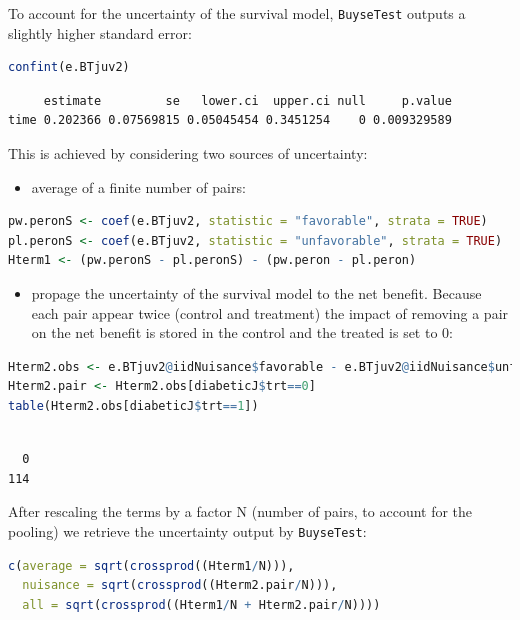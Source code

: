 \documentclass[12pt]{article}
\begin{document}
To account for the uncertainty of the survival model, \texttt{BuyseTest}
outputs a slightly higher standard error:
\begin{lstlisting}[language=r,numbers=none]
confint(e.BTjuv2)
\end{lstlisting}

\label{}
\begin{verbatim}
     estimate         se   lower.ci  upper.ci null     p.value
time 0.202366 0.07569815 0.05045454 0.3451254    0 0.009329589
\end{verbatim}


This is achieved by considering two sources of uncertainty:
\begin{itemize}
\item average of a finite number of pairs:
\end{itemize}
\begin{lstlisting}[language=r,numbers=none]
pw.peronS <- coef(e.BTjuv2, statistic = "favorable", strata = TRUE)
pl.peronS <- coef(e.BTjuv2, statistic = "unfavorable", strata = TRUE)
Hterm1 <- (pw.peronS - pl.peronS) - (pw.peron - pl.peron)
\end{lstlisting}

\begin{itemize}
\item propage the uncertainty of the survival model to the net
benefit. Because each pair appear twice (control and treatment) the
impact of removing a pair on the net benefit is stored in the
control and the treated is set to 0:
\end{itemize}
\begin{lstlisting}[language=r,numbers=none]
Hterm2.obs <- e.BTjuv2@iidNuisance$favorable - e.BTjuv2@iidNuisance$unfavorable
Hterm2.pair <- Hterm2.obs[diabeticJ$trt==0]
table(Hterm2.obs[diabeticJ$trt==1])
\end{lstlisting}

\label{}
\begin{verbatim}

  0 
114
\end{verbatim}


After rescaling the terms by a factor N (number of pairs, to account
for the pooling) we retrieve the uncertainty output by \texttt{BuyseTest}:
\begin{lstlisting}[language=r,numbers=none]
c(average = sqrt(crossprod((Hterm1/N))),
  nuisance = sqrt(crossprod((Hterm2.pair/N))),
  all = sqrt(crossprod((Hterm1/N + Hterm2.pair/N))))
\end{lstlisting}
\end{document}

